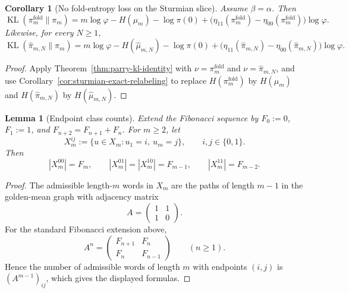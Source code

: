 \documentclass[11pt,letterpaper]{article}
\numberwithin{equation}{section}
\theoremstyle{plain}
\newtheorem{lemma}[theorem]{Lemma}
\newtheorem{corollary}[theorem]{Corollary}
\theoremstyle{definition}
\theoremstyle{remark}
\DeclareMathOperator{\KL}{KL}
\begin{document}
\begin{corollary}[No fold-entropy loss on the Sturmian slice]\label{cor:no-fold-entropy-loss}
Assume \(\beta=\alpha\). Then
\[
\KL(\pi_m^{\mathrm{fold}}\|\pi_m)
=
m\log\varphi-H(\mu_m)-\log\pi(0)
{}+\bigl(\eta_{11}(\pi_m^{\mathrm{fold}})
-\eta_{00}(\pi_m^{\mathrm{fold}})\bigr)\log\varphi.
\]
Likewise, for every \(N\ge 1\),
\[
\KL(\hat\pi_{m,N}\|\pi_m)
=
m\log\varphi-H(\hat\mu_{m,N})-\log\pi(0)
{}+\bigl(\eta_{11}(\hat\pi_{m,N})
-\eta_{00}(\hat\pi_{m,N})\bigr)\log\varphi.
\]
\end{corollary}

\begin{proof}
Apply Theorem~\ref{thm:parry-kl-identity} with
\(\nu=\pi_m^{\mathrm{fold}}\) and \(\nu=\hat\pi_{m,N}\), and use
Corollary~\ref{cor:sturmian-exact-relabeling} to replace
\(H(\pi_m^{\mathrm{fold}})\) by \(H(\mu_m)\) and
\(H(\hat\pi_{m,N})\) by \(H(\hat\mu_{m,N})\).
\end{proof}

\begin{lemma}[Endpoint class counts]\label{lem:endpoint-class-counts}
Extend the Fibonacci sequence by \(F_0:=0\), \(F_1:=1\), and
\(F_{n+2}=F_{n+1}+F_n\). For \(m\ge 2\), let
\[
X_m^{ij}:=\{u\in X_m:u_1=i,\ u_m=j\},
\qquad i,j\in\{0,1\}.
\]
Then
\[
|X_m^{00}|=F_m,\qquad
|X_m^{01}|=|X_m^{10}|=F_{m-1},\qquad
|X_m^{11}|=F_{m-2}.
\]
\end{lemma}

\begin{proof}
The admissible length-\(m\) words in \(X_m\) are the paths of length \(m-1\) in
the golden-mean graph with adjacency matrix
\[
A=\begin{pmatrix}1&1\\1&0\end{pmatrix}.
\]
For the standard Fibonacci extension above,
\[
A^n=
\begin{pmatrix}
F_{n+1} & F_n\\
F_n & F_{n-1}
\end{pmatrix}
\qquad (n\ge 1).
\]
Hence the number of admissible words of length \(m\) with endpoints \((i,j)\) is
\((A^{m-1})_{ij}\), which gives the displayed formulas.
\end{proof}
\end{document}
